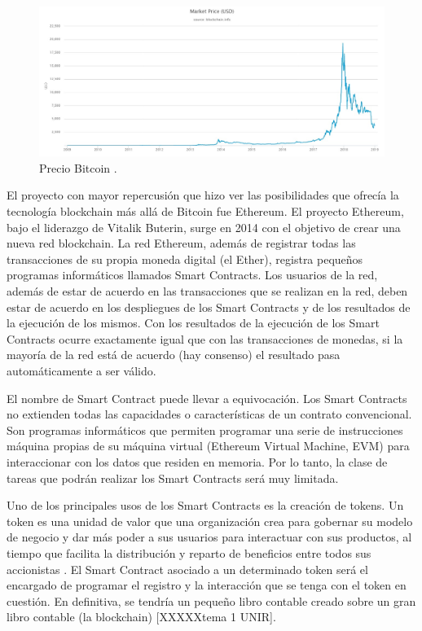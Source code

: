 \begin{figure}
	\centering
	\includegraphics[width=1\textwidth]{imagenes/market-price-(usd).jpeg}
	\caption{\label{fig1}Precio Bitcoin \cite{blockchaininfo}.}
\end{figure}

El proyecto con mayor repercusión que hizo ver las posibilidades que ofrecía la tecnología blockchain más allá de Bitcoin fue Ethereum. El proyecto Ethereum, bajo el liderazgo de Vitalik Buterin, surge en 2014 con el objetivo de crear una nueva red blockchain. La red Ethereum, además de registrar todas las transacciones de su propia moneda digital (el Ether), registra pequeños programas informáticos llamados Smart Contracts. Los usuarios de la red, además de estar de acuerdo en las transacciones que se realizan en la red, deben estar de acuerdo en los despliegues de los Smart Contracts y de los resultados de la ejecución de los mismos. Con los resultados de la ejecución de los Smart Contracts ocurre exactamente igual que con las transacciones de monedas, si la mayoría de la red está de acuerdo (hay consenso) el resultado pasa automáticamente a ser válido. \newline

El nombre de Smart Contract puede llevar a equivocación. Los Smart Contracts no extienden todas las capacidades o características de un contrato convencional. Son programas informáticos que permiten programar una serie de instrucciones máquina propias de su máquina virtual (Ethereum Virtual Machine, EVM) para interaccionar con los datos que residen en memoria. Por lo tanto, la clase de tareas que podrán realizar los Smart Contracts será muy limitada. \newline

Uno de los principales usos de los Smart Contracts es la creación de tokens. Un token es una unidad de valor que una organización crea para gobernar su modelo de negocio y dar más poder a sus usuarios para interactuar con sus productos, al tiempo que facilita la distribución y reparto de beneficios entre todos sus accionistas \cite{business}. El Smart Contract asociado a un determinado token será el encargado de programar el registro y la interacción que se tenga con el token en cuestión. En definitiva, se tendría un pequeño libro contable creado sobre un gran libro contable (la blockchain) [XXXXXtema 1 UNIR]. \newline

